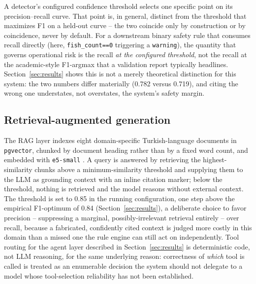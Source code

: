 \begin{formalization}
\label{form:operatingpoint}
A detector's configured confidence threshold selects one specific point on its precision--recall
curve. That point is, in general, distinct from the threshold that maximizes F1 on a held-out
curve -- the two coincide only by construction or by coincidence, never by default. For a
downstream binary safety rule that consumes recall directly (here, \texttt{fish\_count==0}
triggering a \texttt{warning}), the quantity that governs operational risk is the recall
\emph{at the configured threshold}, not the recall at the academic-style F1-argmax that a validation
report typically headlines. Section~\ref{sec:results} shows this is not a merely theoretical
distinction for this system: the two numbers differ materially (0.782 versus 0.719), and citing
the wrong one understates, not overstates, the system's safety margin.
\end{formalization}

\subsection{Retrieval-augmented generation}
\label{sec:rag-pipeline}

The RAG layer indexes eight domain-specific Turkish-language documents in \texttt{pgvector},
chunked by document heading rather than by a fixed word count, and embedded with \texttt{e5-small}
\citep{wang2022e5}. A query is answered by retrieving the highest-similarity chunks above a
minimum-similarity threshold and supplying them to the LLM as grounding context with an inline
citation marker; below the threshold, nothing is retrieved and the model reasons without external
context. The threshold is set to 0.85 in the running configuration, one step above the empirical F1-optimum of
0.84 (Section~\ref{sec:results}), a deliberate choice to favor precision -- suppressing a marginal,
possibly-irrelevant retrieval entirely -- over recall, because a fabricated, confidently cited
context is judged more costly in this domain than a missed one the rule engine can still act on
independently. Tool routing for the agent layer described in Section~\ref{sec:results} is
deterministic code, not LLM reasoning, for the same underlying reason: correctness of \emph{which}
tool is called is treated as an enumerable decision the system should not delegate to a model whose
tool-selection reliability has not been established.


